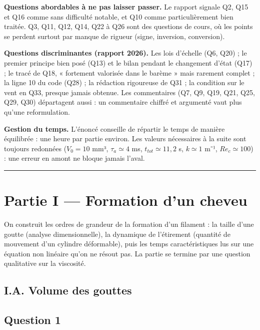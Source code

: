 \documentclass[11pt,a4paper]{article}
\begin{document}
\textbf{Questions abordables à ne pas laisser passer.} Le rapport signale Q2, Q15 et Q16 comme sans difficulté notable, et Q10 comme particulièrement bien traitée. Q3, Q11, Q12, Q14, Q22 à Q26 sont des questions de cours, où les points se perdent surtout par manque de rigueur (signe, inversion, conversion).

\textbf{Questions discriminantes (rapport 2026).} Les lois d'échelle (Q6, Q20) ; le premier principe bien posé (Q13) et le bilan pendant le changement d'état (Q17) ; le tracé de Q18, « fortement valorisée dans le barème » mais rarement complet ; la ligne 10 du code (Q28) ; la rédaction rigoureuse de Q31 ; la condition sur le vent en Q33, presque jamais obtenue. Les commentaires (Q7, Q9, Q19, Q21, Q25, Q29, Q30) départagent aussi : un commentaire chiffré et argumenté vaut plus qu'une reformulation.

\textbf{Gestion du temps.} L'énoncé conseille de répartir le temps de manière équilibrée : une heure par partie environ. Les valeurs nécessaires à la suite sont toujours redonnées (\(V_0 = 10\) mm³, \(\tau_a \simeq 4\) ms, \(t_{tot} \simeq 11{,}2\) s, \(k \simeq 1\) m⁻¹, \(Re_c \simeq 100\)) : une erreur en amont ne bloque jamais l'aval.

\begin{center}\rule{0.5\linewidth}{0.5pt}\end{center}

\hypertarget{partie-i-formation-dun-cheveu}{%
\section{Partie I --- Formation d'un cheveu}\label{partie-i-formation-dun-cheveu}}

On construit les ordres de grandeur de la formation d'un filament : la taille d'une goutte (analyse dimensionnelle), la dynamique de l'étirement (quantité de mouvement d'un cylindre déformable), puis les temps caractéristiques lus sur une équation non linéaire qu'on ne résout pas. La partie se termine par une question qualitative sur la viscosité.

\hypertarget{i.a.-volume-des-gouttes}{%
\subsection{I.A. Volume des gouttes}\label{i.a.-volume-des-gouttes}}

\hypertarget{question-1}{%
\subsection{Question 1}\label{question-1}}
\end{document}
